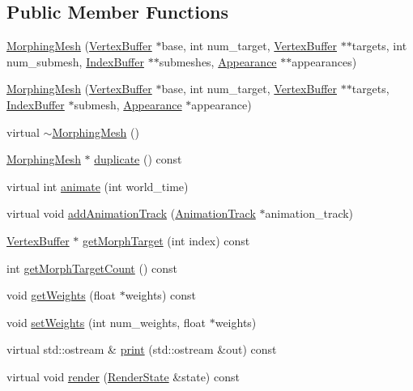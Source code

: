 \subsection*{Public Member Functions}
\begin{CompactItemize}
\item 
\hyperlink{classm3g_1_1MorphingMesh_211192cdba0b1d136977403ba4ed0d0c}{MorphingMesh} (\hyperlink{classm3g_1_1VertexBuffer}{VertexBuffer} $\ast$base, int num\_\-target, \hyperlink{classm3g_1_1VertexBuffer}{VertexBuffer} $\ast$$\ast$targets, int num\_\-submesh, \hyperlink{classm3g_1_1IndexBuffer}{IndexBuffer} $\ast$$\ast$submeshes, \hyperlink{classm3g_1_1Appearance}{Appearance} $\ast$$\ast$appearances)
\item 
\hyperlink{classm3g_1_1MorphingMesh_4a2347ee9c813fa1a6eef998f37bf6d5}{MorphingMesh} (\hyperlink{classm3g_1_1VertexBuffer}{VertexBuffer} $\ast$base, int num\_\-target, \hyperlink{classm3g_1_1VertexBuffer}{VertexBuffer} $\ast$$\ast$targets, \hyperlink{classm3g_1_1IndexBuffer}{IndexBuffer} $\ast$submesh, \hyperlink{classm3g_1_1Appearance}{Appearance} $\ast$appearance)
\item 
virtual \hyperlink{classm3g_1_1MorphingMesh_cdafafba64a0167f28f3b66ac4b9d7d6}{$\sim$MorphingMesh} ()
\item 
\hyperlink{classm3g_1_1MorphingMesh}{MorphingMesh} $\ast$ \hyperlink{classm3g_1_1MorphingMesh_7e7b2c3c4c988c6341a5e249bd468f57}{duplicate} () const 
\item 
virtual int \hyperlink{classm3g_1_1MorphingMesh_8aad1ceab4c2a03609c8a42324ce484d}{animate} (int world\_\-time)
\item 
virtual void \hyperlink{classm3g_1_1MorphingMesh_415c0b110f95410ded9b85e5d99a496b}{addAnimationTrack} (\hyperlink{classm3g_1_1AnimationTrack}{AnimationTrack} $\ast$animation\_\-track)
\item 
\hyperlink{classm3g_1_1VertexBuffer}{VertexBuffer} $\ast$ \hyperlink{classm3g_1_1MorphingMesh_44766cc08b595f074d0d698c75f544b4}{getMorphTarget} (int index) const 
\item 
int \hyperlink{classm3g_1_1MorphingMesh_620d9684124201f738a28c7c39641541}{getMorphTargetCount} () const 
\item 
void \hyperlink{classm3g_1_1MorphingMesh_80cef3b2c5e4881567409829de224e46}{getWeights} (float $\ast$weights) const 
\item 
void \hyperlink{classm3g_1_1MorphingMesh_b97015e8aeed76a33582eb11d06e322b}{setWeights} (int num\_\-weights, float $\ast$weights)
\item 
virtual std::ostream \& \hyperlink{classm3g_1_1MorphingMesh_6fea17fa1532df3794f8cb39cb4f911f}{print} (std::ostream \&out) const 
\item 
virtual void \hyperlink{classm3g_1_1MorphingMesh_8babc8a79b78615da51161e94029eea9}{render} (\hyperlink{structm3g_1_1RenderState}{RenderState} \&state) const 
\end{CompactItemize}
